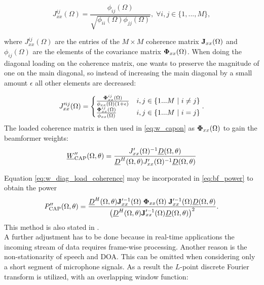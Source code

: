 \begin{equation}
J_{xx}^{ij}(\Omega) = \frac{\phi_{ij}(\Omega)}{\sqrt{\phi_{ii}(\Omega)\phi_{jj}(\Omega)}},\; \forall i,j \in \{1,...,M\} ,
\label{eq:coherence}
\end{equation}

where $J_{xx}^{ij}(\Omega)$ are the entries of the $M \times M$ coherence matrix $\mathbf{J}_{xx}(\Omega)$ and $\phi_{ij}(\Omega)$ are the elements of the covariance matrix $\mathbf{\Phi}_{xx}(\Omega)$.
When doing the diagonal loading on the coherence matrix, one wants to preserve the magnitude of one on the main diagonal, so instead of increasing the main diagonal by a small amount $\epsilon$ all other elements are decreased:

\begin{equation}
J'^{ij}_{xx}(\Omega) =
	\begin{cases}
		\frac{\mathbf{\Phi}_{xx}^{ij}(\Omega)}{\mathbf{\phi}_{xx}(\Omega)(1+\epsilon)}& i,j \in \{1...M\ |\  i \neq j\}\\
		\frac{\mathbf{\Phi}_{xx}^{ij}(\Omega)}{\mathbf{\phi}_{xx}(\Omega)} & i,j \in \{1...M\ |\  i = j\}
	\end{cases}.
\end{equation}
The loaded coherence matrix is then used in \ref{eq:w_capon} as $\mathbf{\Phi}_{xx}(\Omega)$ to gain the beamformer weights:
\begin{equation}
\underline{W}''_\text{CAP}(\Omega,\theta)= \frac{J'_{xx}(\Omega)^{-1} \underline{D}(\Omega,\theta)}{\underline{D}^H(\Omega,\theta)J'_{xx}(\Omega)^{-1} \underline{D}(\Omega,\theta)}
\label{eq:w_diag_load_coherence}
\end{equation}

Equation \ref{eq:w_diag_load_coherence} may be incorporated in \ref{eq:bf_power} to obtain the power
\begin{equation}
P''_\text{CAP}(\Omega, \theta) =
\frac{\underline{D}^H(\Omega,\theta) \mathbf{J}'^{-1}_{xx}(\Omega) \;{\mathbf{\Phi}}_{xx}(\Omega) \; \mathbf{J}'^{-1}_{xx}(\Omega) \underline{D}(\Omega,\theta)}
{\big(\underline{D}^H(\Omega,\theta) \mathbf{J}'^{-1}_{xx}(\Omega) \underline{D}(\Omega,\theta)\big)^2}.
\label{eq:p_diag_load_coherence}
\end{equation}
This method is also stated in \cite[Chapter~2]{brandstein2013microphone}.\\
A further adjustment has to be done because in real-time applications the incoming stream of data requires frame-wise processing. Another reason is the non-stationarity of speech and \ac{DOA}. This can be omitted when  considering only a short segment of microphone signals. As a result the $L$-point discrete Fourier transform is utilized, with an overlapping window function:


